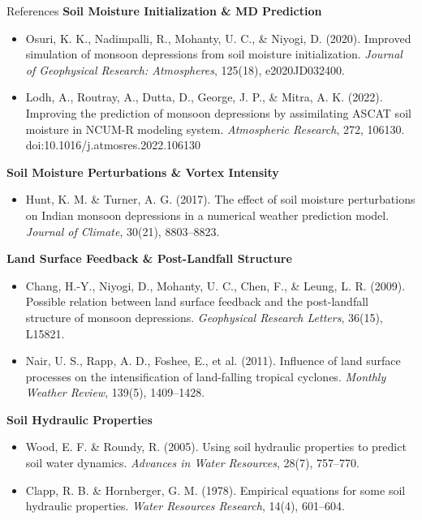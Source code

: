 \documentclass[10pt, aspectratio=169,t,xcolor=table]{beamer}
\begin{document}
\begin{frame}{References}
	\vspace{-0.2cm}
	\footnotesize
	\textbf{Soil Moisture Initialization \& MD Prediction}
	\begin{itemize}\scriptsize
		\item Osuri, K. K., Nadimpalli, R., Mohanty, U. C., \& Niyogi, D. (2020). Improved simulation of monsoon depressions from soil moisture initialization. \textit{Journal of Geophysical Research: Atmospheres}, 125(18), e2020JD032400.
		\item Lodh, A., Routray, A., Dutta, D., George, J. P., \& Mitra, A. K. (2022). Improving the prediction of monsoon depressions by assimilating ASCAT soil moisture in NCUM-R modeling system. \textit{Atmospheric Research}, 272, 106130. doi:10.1016/j.atmosres.2022.106130
	\end{itemize}

	\vspace{-0.1cm}
	\footnotesize
	\textbf{Soil Moisture Perturbations \& Vortex Intensity}
	\begin{itemize}\scriptsize
		\item Hunt, K. M. \& Turner, A. G. (2017). The effect of soil moisture perturbations on Indian monsoon depressions in a numerical weather prediction model. \textit{Journal of Climate}, 30(21), 8803–8823.
	\end{itemize}

	\vspace{-0.1cm}
	\footnotesize
	\textbf{Land Surface Feedback \& Post-Landfall Structure}
	\begin{itemize}\scriptsize
		\item Chang, H.-Y., Niyogi, D., Mohanty, U. C., Chen, F., \& Leung, L. R. (2009). Possible relation between land surface feedback and the post-landfall structure of monsoon depressions. \textit{Geophysical Research Letters}, 36(15), L15821.
		\item Nair, U. S., Rapp, A. D., Foshee, E., et al. (2011). Influence of land surface processes on the intensification of land-falling tropical cyclones. \textit{Monthly Weather Review}, 139(5), 1409–1428.
	\end{itemize}

	\vspace{-0.1cm}
	\footnotesize
	\textbf{Soil Hydraulic Properties}
	\begin{itemize}\scriptsize
		\item Wood, E. F. \& Roundy, R. (2005). Using soil hydraulic properties to predict soil water dynamics. \textit{Advances in Water Resources}, 28(7), 757–770.
		\item Clapp, R. B. \& Hornberger, G. M. (1978). Empirical equations for some soil hydraulic properties. \textit{Water Resources Research}, 14(4), 601–604.
	\end{itemize}
\end{frame}
\end{document}
